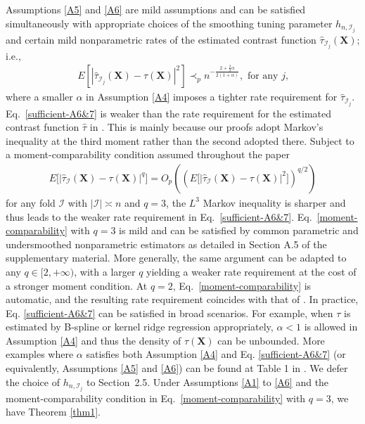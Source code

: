 \documentclass[11pt]{article}
\theoremstyle{referenceplain}
\theoremstyle{referencedefinition}
\theoremstyle{referenceremark}
\begin{document}
Assumptions \ref{A5} and \ref{A6} are mild assumptions and can be satisfied simultaneously with appropriate choices of the smoothing tuning parameter $h_{n,\mathcal{I}_{j}}$ and certain mild nonparametric rates of the estimated contrast function $\widehat{\tau}_{\mathcal{I}_j}(\mathbf{X})$; i.e., 
\begin{align}\label{sufficient-A6&7}
    E[|\widehat{\tau}_{\mathcal{I}_j}(\mathbf{X})-\tau(\mathbf{X})|^2]\prec_p n^{-\frac{2+\frac{2}{3}\alpha}{2(1+\alpha)}}, \text{ for any $j$,}
\end{align}
where a smaller $\alpha$ in Assumption \ref{A4} imposes a tighter rate requirement for $\widehat{\tau}_{\mathcal{I}_j}$. Eq.~\eqref{sufficient-A6&7} is weaker than the rate requirement for the estimated contrast function $\widehat{\tau}$ in \citet{shi2020breaking}. This is mainly because our proofs adopt Markov's inequality at the third moment rather than the second adopted there. Subject to a moment-comparability condition assumed throughout the paper
\begin{align}
\label{moment-comparability}
E\bigl[|\widehat{\tau}_{\mathcal{I}}(\mathbf{X})-\tau(\mathbf{X})|^{q}\bigr]
=O_p\left(\left(E\bigl[|\widehat{\tau}_{\mathcal{I}}(\mathbf{X})-\tau(\mathbf{X})|^{2}\bigr]\right)^{q/2}\right)
\end{align}
for any fold $\mathcal{I}$ with $|\mathcal{I}|\asymp n$ and $q=3$, the $L^3$ Markov inequality is sharper and thus leads to the weaker rate requirement in Eq.~\eqref{sufficient-A6&7}. Eq.~\eqref{moment-comparability} with $q=3$ is mild and can be satisfied by common parametric and undersmoothed nonparametric estimators as detailed in Section A.5 of the supplementary material. More generally, the same argument can be adapted to any $q\in[2,+\infty)$, with a larger $q$ yielding a weaker rate requirement at the cost of a stronger moment condition. At $q=2$, Eq.~\eqref{moment-comparability} is automatic, and the resulting rate requirement coincides with that of \citet{shi2020breaking}. In practice, Eq. \eqref{sufficient-A6&7} can be satisfied in broad 
scenarios. For example,  
when $\tau$ is estimated by B-spline \citep{shen1998local} 
or kernel ridge regression \citep{zhang2013divide} appropriately, $\alpha<1$ is allowed in Assumption \ref{A4} and thus the density of $\tau(\mathbf{X})$ can be unbounded. 
More examples where $\alpha$ satisfies both Assumption \ref{A4} and Eq. \eqref{sufficient-A6&7} (or equivalently, Assumptions \ref{A5} and \ref{A6}) can be found at Table 1 in \citet{shi2020breaking}.
We defer the choice of $h_{n,\mathcal{I}_j}$ to Section~2.5. Under Assumptions \ref{A1} to \ref{A6} and the moment-comparability condition in Eq.~\eqref{moment-comparability} with $q=3$, we have Theorem \ref{thm1}.
\end{document}
